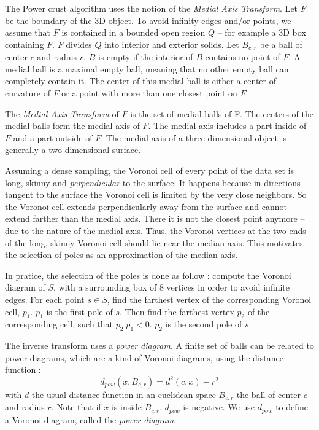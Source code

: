 \documentclass[12pt]{article}
\begin{document}
The Power crust algorithm uses the notion of the \textit{Medial Axis Transform}. Let $F$ be the boundary of the 3D object. To avoid infinity edges and/or points, we assume that $F$ is contained in a bounded open region $Q$ -- for example a 3D box containing $F$. $F$ divides $Q$ into interior and exterior solids. Let $B_{c,r}$ be a ball of center $c$ and radius $r$. $B$ is empty if the interior of $B$ contains no point of $F$. A medial ball is a maximal empty ball, meaning that no other empty ball can completely contain it. The center of this medial ball is either a center of curvature of $F$ or a point with more than one closest point on $F$.

The \textit{Medial Axis Transform} of $F$ is the set of medial balls of F. The centers of the medial balls form the medial axis of $F$. The medial axis includes a part inside of $F$ and a part outside of $F$. The medial axis of a three-dimensional object is generally a two-dimensional surface.

Assuming a dense sampling, the Voronoi cell of every point of the data set is long, skinny and \textit{perpendicular} to the surface. It happens because in directions tangent to the surface the Voronoi cell is limited by the very close neighbors. So the Voronoi cell extends perpendicularly away from the surface and cannot extend farther than the medial axis. There it is not the closest point anymore -- due to the nature of the medial axis. Thus, the Voronoi vertices at the two ends of the long, skinny Voronoi cell should lie near the median axis. This motivates the selection of poles as an approximation of the median axis.

In pratice, the selection of the poles is done as follow : compute the Voronoi diagram of $S$, with a surrounding box of 8 vertices in order to avoid infinite edges. For each point $s \in S$, find the farthest vertex of the corresponding Voronoi cell, $p_1$. $p_1$ is the first pole of $s$. Then find the farthest vertex $p_2$ of the corresponding cell, such that $p_2.p_1 < 0$. $p_2$ is the second pole of $s$.

The inverse transform uses a \textit{power diagram}. A finite set of balls can be related to power diagrams, which are a kind of Voronoi diagrams, using the distance function :
$$d_{pow}(x, B_{c,r}) = d^2(c,x) - r^2$$
with $d$ the usual distance function in an euclidean space  $B_{c,r}$ the ball of center $c$ and radius $r$. Note that if $x$ is inside $B_{c,r}$, $d_{pow}$ is negative. We use $d_{pow}$ to define a Voronoi diagram, called the \textit{power diagram}.
\end{document}
